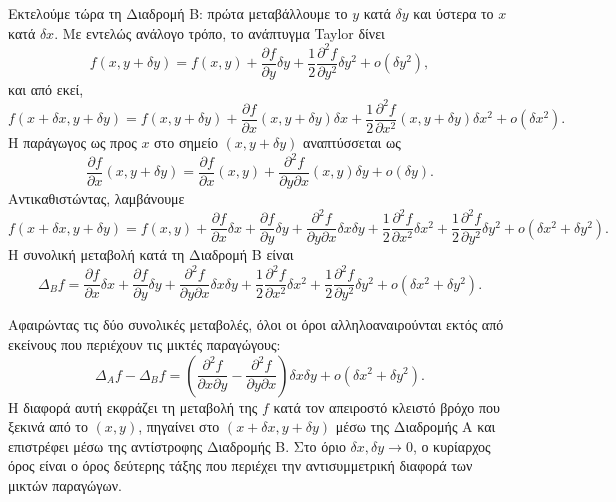 \documentclass[11pt,a4paper,twoside,openright]{book}
\begin{document}
Εκτελούμε τώρα τη Διαδρομή Β: πρώτα μεταβάλλουμε το \(y\) κατά \(\delta y\) και ύστερα το \(x\) κατά \(\delta x\). Με εντελώς ανάλογο τρόπο, το ανάπτυγμα Taylor δίνει
\begin{equation}
f(x, y+\delta y) = f(x,y) + \frac{\partial f}{\partial y} \delta y + \frac{1}{2} \frac{\partial^2 f}{\partial y^2} \delta y^2 + o(\delta y^2),
\end{equation}
και από εκεί,
\begin{equation}
f(x+\delta x, y+\delta y) = f(x, y+\delta y) + \frac{\partial f}{\partial x}(x, y+\delta y) \delta x + \frac{1}{2} \frac{\partial^2 f}{\partial x^2}(x, y+\delta y) \delta x^2 + o(\delta x^2).
\end{equation}
Η παράγωγος ως προς \(x\) στο σημείο \((x, y+\delta y)\) αναπτύσσεται ως
\begin{equation}
\frac{\partial f}{\partial x}(x, y+\delta y) = \frac{\partial f}{\partial x}(x,y) + \frac{\partial^2 f}{\partial y \partial x}(x,y) \delta y + o(\delta y).
\end{equation}
Αντικαθιστώντας, λαμβάνουμε
\begin{equation}
f(x+\delta x, y+\delta y) = f(x,y) + \frac{\partial f}{\partial x} \delta x + \frac{\partial f}{\partial y} \delta y + \frac{\partial^2 f}{\partial y \partial x} \delta x \delta y + \frac{1}{2} \frac{\partial^2 f}{\partial x^2} \delta x^2 + \frac{1}{2} \frac{\partial^2 f}{\partial y^2} \delta y^2 + o(\delta x^2 + \delta y^2).
\end{equation}
Η συνολική μεταβολή κατά τη Διαδρομή Β είναι
\begin{equation}
\Delta_B f = \frac{\partial f}{\partial x} \delta x + \frac{\partial f}{\partial y} \delta y + \frac{\partial^2 f}{\partial y \partial x} \delta x \delta y + \frac{1}{2} \frac{\partial^2 f}{\partial x^2} \delta x^2 + \frac{1}{2} \frac{\partial^2 f}{\partial y^2} \delta y^2 + o(\delta x^2 + \delta y^2).
\end{equation}

Αφαιρώντας τις δύο συνολικές μεταβολές, όλοι οι όροι αλληλοαναιρούνται εκτός από εκείνους που περιέχουν τις μικτές παραγώγους:
\begin{equation}
\Delta_A f - \Delta_B f = \left( \frac{\partial^2 f}{\partial x \partial y} - \frac{\partial^2 f}{\partial y \partial x} \right) \delta x \delta y + o(\delta x^2 + \delta y^2).
\end{equation}
Η διαφορά αυτή εκφράζει τη μεταβολή της \(f\) κατά τον απειροστό κλειστό βρόχο που ξεκινά από το \((x,y)\), πηγαίνει στο \((x+\delta x, y+\delta y)\) μέσω της Διαδρομής Α και επιστρέφει μέσω της αντίστροφης Διαδρομής Β. Στο όριο \(\delta x, \delta y \to 0\), ο κυρίαρχος όρος είναι ο όρος δεύτερης τάξης που περιέχει την αντισυμμετρική διαφορά των μικτών παραγώγων.
\end{document}
